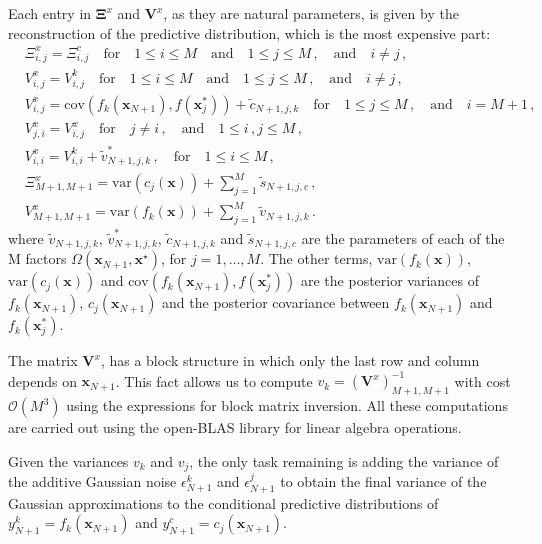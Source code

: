 \documentclass[review,preprint,12pt]{elsarticle}
\begin{document}
Each entry in $\boldsymbol{\Xi}^x$ and $\boldsymbol{V}^x$, as they are natural parameters, is given by the reconstruction of the predictive distribution, which is the most expensive part:
\begin{align}
    & \Xi_{i,j}^{x} = \Xi_{i,j}^{c} \quad \textrm{for} \quad 1 \leq i \leq M \quad \textrm{and} \quad 1 \leq j \leq M \,, \quad \textrm{and} \quad i \neq j \,, \nonumber \\
    & V_{i,j}^{x} = V_{i,j}^{k}  \quad \textrm{for} \quad 1 \leq i \leq M \quad \textrm{and} \quad 1 \leq j \leq M \,, \quad \textrm{and} \quad i \neq j \,, \nonumber \\
    & V_{i,j}^{x} = \textrm{cov} (f_k(\textbf{x}_{N+1}),f(\textbf{x}_{j}^{*})) + \tilde{c}_{N+1,j,k} \quad \textrm{for} \quad 1 \leq j \leq M \,, \quad \textrm{and} \quad i = M+1 \,, \nonumber \\ 
    & V_{j,i}^{x} = V_{i,j}^{x} \quad \textrm{for} \quad j \neq i\,, \quad \textrm{and} \quad 1 \leq i\,,j \leq M \,, \nonumber \\
    & V_{i,i}^{x} = V_{i,i}^{k} + \tilde{v}_{N+1,j,k}^{*}\,, \quad \textrm{for} \quad 1 \leq i \leq M \,, \nonumber \\
    & \Xi_{M+1,M+1}^{x} = \textrm{var}(c_j(\textbf{x})) + \sum_{j=1}^{M}\tilde{s}_{N+1,j,c} \,, \nonumber \\
    & V_{M+1,M+1}^{x} = \textrm{var}(f_k(\textbf{x})) + \sum_{j=1}^{M}\tilde{v}_{N+1,j,k}\,. 
\end{align}
where $\tilde{v}_{N+1,j,k}$, $\tilde{v}_{N+1,j,k}^{*}$, $\tilde{c}_{N+1,j,k}$ and $\tilde{s}_{N+1,j,c}$ are the parameters of each of the M factors $\Omega(\textbf{x}_{N+1},\textbf{x}^{\star})$, for $j = 1,\ldots,M$. The other terms, $\textrm{var}(f_k(\textbf{x}))$, 
$\textrm{var}(c_j(\textbf{x}))$ and $\textrm{cov} (f_k(\textbf{x}_{N+1}),f(\textbf{x}_{j}^{*}))$ are the posterior variances of $f_k(\textbf{x}_{N+1})$, $c_j(\textbf{x}_{N+1})$ and the posterior covariance between $f_k(\textbf{x}_{N+1})$ and $f_k(\textbf{x}_{j}^{*})$.

The matrix $\textbf{V}^x$, has a block structure in which only the last row and column depends on $\textbf{x}_{N+1}$. This fact allows us to compute $v_k = (\textbf{V}^x)_{M+1,M+1}^{-1}$ with cost $\mathcal{O}(M^3)$ using the expressions for block matrix inversion. All these computations are carried out using the open-BLAS library for linear algebra operations.

Given the variances $v_k$ and $v_j$, the only task remaining is adding the variance of the additive Gaussian noise $\epsilon_{N+1}^{k}$ and $\epsilon_{N+1}^{j}$ to obtain the final variance of the Gaussian approximations to the conditional predictive distributions of $y_{N+1}^{k} = f_k(\boldsymbol{x}_{N+1})$ and $y_{N+1}^{c} = c_j(\boldsymbol{x}_{N+1})$.
\end{document}
